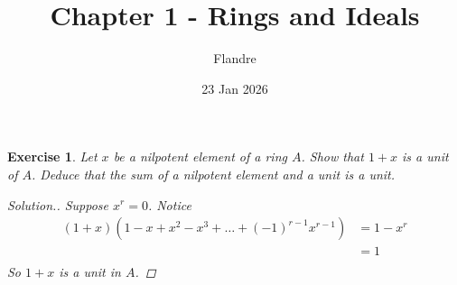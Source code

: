 \documentclass{article}
\title{Chapter 1 - Rings and Ideals}
\author{Flandre}
\date{23 Jan 2026}
\theoremstyle{breakstyle}
\newtheorem{exercise}{Exercise}
\newenvironment{solution}
  {\begin{proof}[Solution.]\renewcommand{\qedsymbol}{}}
  {\end{proof}}
\begin{document}
\maketitle

\begin{exercise}
Let \(x\) be a nilpotent element of a ring \(A\). Show that \(1+x\) is a unit of \(A\). Deduce that the sum of a nilpotent element and a unit is a unit.

\begin{solution}
    Suppose $x^{r}=0$.
        Notice
        \begin{align*}
            (1+x)\left( 1-x+x^2-x^3+\ldots +(-1)^{r-1}x^{r-1} \right) 
            &= 1-x^{r} \\
            &= 1 \\
        \end{align*}
        So $1+x$ is a unit in $A$.
\end{solution}
\end{exercise}
\end{document}
